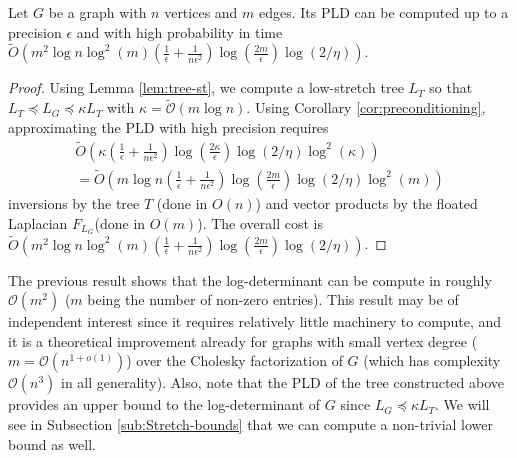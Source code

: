 \begin{theorem} \label{thm:PLD-tree}Let $G$ be a graph with $n$
vertices and $m$ edges. Its PLD can be computed up to a precision
$\epsilon$ and with high probability in time $\tilde{O}\left(m^{2}\log n\log^{2} \left(m\right) \left(\frac{1}{\epsilon}+\frac{1}{n\epsilon^{2}}\right) \log\left(\frac{2m}{\epsilon}\right) \log\left(2/\eta\right)\right)$.\end{theorem}

\begin{proof} Using Lemma \eqref{lem:tree-st}, we compute a low-stretch
tree $L_{T}$ so that $L_{T}\preceq L_{G}\preceq\kappa L_{T}$ with
$\kappa=\tilde{\mathcal{O}}\left(m\log n\right)$. Using Corollary
\eqref{cor:preconditioning}, approximating the PLD with high precision
requires 
\begin{eqnarray*}
\tilde{O}\left(\kappa\left(\frac{1}{\epsilon}+\frac{1}{n\epsilon^{2}}\right)\log\left(\frac{2\kappa}{\epsilon}\right)\log\left(2/\eta\right)\log^{2}\left(\kappa\right)\right)\\
=\tilde{O}\left(m\log n\left(\frac{1}{\epsilon}+\frac{1}{n\epsilon^{2}}\right)\log\left(\frac{2m}{\epsilon}\right)\log\left(2/\eta\right)\log^{2}\left(m\right)\right)
\end{eqnarray*}
 inversions by the tree $T$ (done in $O\left(n\right)$) and vector
products by the floated Laplacian $F_{L_{G}}$(done in $O\left(m\right)$).
The overall cost is $\tilde{O}\left(m^{2}\log n\log^{2}\left(m\right)\left(\frac{1}{\epsilon}+\frac{1}{n\epsilon^{2}}\right)\log\left(\frac{2m}{\epsilon}\right)\log\left(2/\eta\right)\right)$.
\end{proof}

The previous result shows that the log-determinant can be compute
in roughly $\mathcal{O}\left(m^{2}\right)$ ($m$ being the number
of non-zero entries). This result may be of independent interest since
it requires relatively little machinery to compute, and it is a theoretical
improvement already for graphs with small vertex degree ($m=\mathcal{O}\left(n^{1+o\left(1\right)}\right)$)
over the Cholesky factorization of $G$ (which has complexity $\mathcal{O}\left(n^{3}\right)$
in all generality). Also, note that the PLD of the tree constructed
above provides an upper bound to the log-determinant of $G$ since
$L_{G}\preceq\kappa L_{T}$. We will see in Subsection \ref{sub:Stretch-bounds}
that we can compute a non-trivial lower bound as well. 